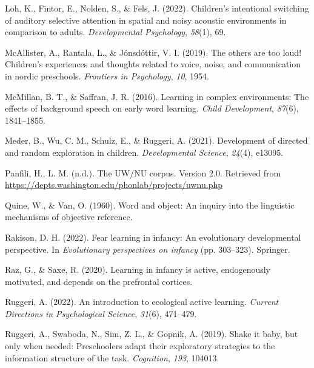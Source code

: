 \documentclass[10pt, letterpaper]{article}
\newenvironment{CSLReferences}%
  {}%
  {\par}
\begin{document}
\begin{CSLReferences}{1}{0}
\leavevmode{}%
Loh, K., Fintor, E., Nolden, S., \& Fels, J. (2022). Children's
intentional switching of auditory selective attention in spatial and
noisy acoustic environments in comparison to adults. \emph{Developmental
Psychology}, \emph{58}(1), 69.

\leavevmode{}%
McAllister, A., Rantala, L., \& Jónsdóttir, V. I. (2019). The others are
too loud! Children's experiences and thoughts related to voice, noise,
and communication in nordic preschools. \emph{Frontiers in Psychology},
\emph{10}, 1954.

\leavevmode{}%
McMillan, B. T., \& Saffran, J. R. (2016). Learning in complex
environments: The effects of background speech on early word learning.
\emph{Child Development}, \emph{87}(6), 1841--1855.

\leavevmode{}%
Meder, B., Wu, C. M., Schulz, E., \& Ruggeri, A. (2021). Development of
directed and random exploration in children. \emph{Developmental
Science}, \emph{24}(4), e13095.

\leavevmode{}%
Panfili, H., L. M. (n.d.). The UW/NU corpus. Version 2.0. Retrieved from
\url{https://depts.washington.edu/phonlab/projects/uwnu.php}

\leavevmode{}%
Quine, W., \& Van, O. (1960). Word and object: An inquiry into the
linguistic mechanisms of objective reference.

\leavevmode{}%
Rakison, D. H. (2022). Fear learning in infancy: An evolutionary
developmental perspective. In \emph{Evolutionary perspectives on
infancy} (pp. 303--323). Springer.

\leavevmode{}%
Raz, G., \& Saxe, R. (2020). Learning in infancy is active, endogenously
motivated, and depends on the prefrontal cortices.

\leavevmode{}%
Ruggeri, A. (2022). An introduction to ecological active learning.
\emph{Current Directions in Psychological Science}, \emph{31}(6),
471--479.

\leavevmode{}%
Ruggeri, A., Swaboda, N., Sim, Z. L., \& Gopnik, A. (2019). Shake it
baby, but only when needed: Preschoolers adapt their exploratory
strategies to the information structure of the task. \emph{Cognition},
\emph{193}, 104013.


\end{CSLReferences}
\end{document}
